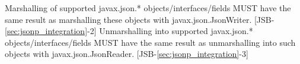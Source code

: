 Marshalling of supported javax.json.* objects/interfaces/fields MUST have the same result as marshalling these objects with javax.json.JsonWriter. [JSB-\ref{sec:jsonp_integration}-2]
Unmarshalling into supported javax.json.* objects/interfaces/fields MUST have the same result as unmarshalling into such objects with javax.json.JsonReader. [JSB-\ref{sec:jsonp_integration}-3]